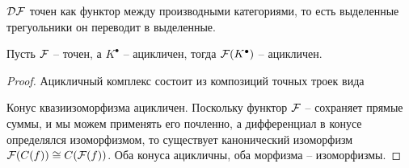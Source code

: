 \documentclass[../main.tex]{subfiles}
\begin{document}
\begin{to_claim}
 $\mathcal{D F}$ точен как функтор между производными категориями, то есть выделенные трегуольники он переводит в выделенные.
\end{to_claim}
\begin{to_claim}
    Пусть $\mathcal{F}$ -- точен, а $K^\bullet$ -- ацикличен, тогда $\mathcal{F}{}(K^\bullet)$ -- ацикличен.
\end{to_claim}
\begin{proof}
    Ацикличный комплекс состоит из композиций точных троек вида 
    \bee
    \eee
    Конус квазиизоморфизма ацикличен. Поскольку функтор $\mathcal{F}$ -- сохраняет прямые суммы, и мы можем применять его почленно, а дифференциал в конусе определялся изоморфизмом, то существует канонический изоморфизм $\mathcal{F}(C(f))\cong C(\mathcal{F}(f))$. Оба конуса ацикличны, оба морфизма -- изоморфизмы.
\end{proof}
\end{document}
